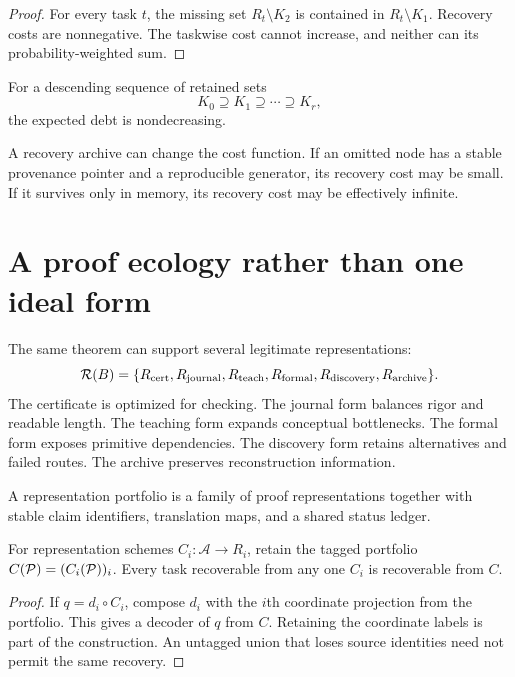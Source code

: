 \begin{proof}
For every task $t$, the missing set $R_t\setminus K_2$ is contained in $R_t\setminus K_1$. Recovery costs are nonnegative. The taskwise cost cannot increase, and neither can its probability-weighted sum.
\end{proof}

\begin{PPTcorollary}
\label{PPT:res:10:4}
For a descending sequence of retained sets
\[
K_0\supseteq K_1\supseteq\cdots\supseteq K_r,
\]
the expected debt is nondecreasing.
\end{PPTcorollary}

A recovery archive can change the cost function. If an omitted node has a stable provenance pointer and a reproducible generator, its recovery cost may be small. If it survives only in memory, its recovery cost may be effectively infinite.


\section{A proof ecology rather than one ideal form}
\label{PPT:sec:old11}

The same theorem can support several legitimate representations:
\[
\mathcal R(B)=
\{R_{\mathrm{cert}},R_{\mathrm{journal}},R_{\mathrm{teach}},
R_{\mathrm{formal}},R_{\mathrm{discovery}},R_{\mathrm{archive}}\}.
\]
The certificate is optimized for checking. The journal form balances rigor and readable length. The teaching form expands conceptual bottlenecks. The formal form exposes primitive dependencies. The discovery form retains alternatives and failed routes. The archive preserves reconstruction information.

\begin{PPTdefinition}
\label{PPT:res:11:1}
A representation portfolio is a family of proof representations together with stable claim identifiers, translation maps, and a shared status ledger.
\end{PPTdefinition}

\begin{PPTproposition}
\label{PPT:res:11:2}
For representation schemes $C_i:\mathscr A\to R_i$, retain the tagged portfolio $C(\mathcal P)=(C_i(\mathcal P))_i$. Every task recoverable from any one $C_i$ is recoverable from $C$.
\end{PPTproposition}

\begin{proof}
If $q=d_i\circ C_i$, compose $d_i$ with the $i$th coordinate projection from the portfolio. This gives a decoder of $q$ from $C$. Retaining the coordinate labels is part of the construction. An untagged union that loses source identities need not permit the same recovery.
\end{proof}

